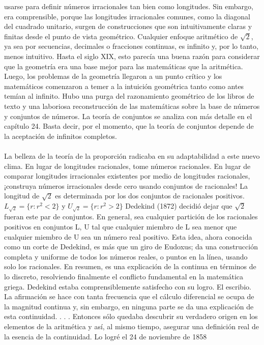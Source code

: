 \documentclass{book}
\begin{document}
    usarse para definir números irracionales tan bien como longitudes. Sin embargo, era comprensible, 
    porque las longitudes irracionales comunes, como la diagonal del cuadrado unitario, surgen de 
    construcciones que son intuitivamente claras y finitas desde el punto de vista geométrico. 
    Cualquier enfoque aritmético de $\sqrt{2}$, ya sea por secuencias, decimales o fracciones continuas, 
    es infinito y, por lo tanto, menos intuitivo. Hasta el siglo XIX, esto parecía una buena razón 
    para considerar que la geometría era una base mejor para las matemáticas que la aritmética.
    Luego, los problemas de la geometría llegaron a un punto crítico y
    los matemáticos comenzaron a temer a la intuición geométrica tanto como antes temían al infinito.
    Hubo una purga del razonamiento geométrico de los libros de texto y una laboriosa reconstrucción 
    de las matemáticas sobre la base de números y conjuntos de números. La teoría de conjuntos 
    se analiza con más detalle en el capítulo 24. Basta decir, por el momento, que la teoría de 
    conjuntos depende de la aceptación de infinitos completos.
    \\ \\ 
    La belleza de la teoría de la proporción radicaba en su adaptabilidad a este nuevo clima. 
    En lugar de longitudes racionales, tome números racionales. En lugar de comparar longitudes 
    irracionales existentes por medio de longitudes racionales,
    ¡construya números irracionales desde cero usando conjuntos de racionales!
    La longitud de $\sqrt{2}$ es determinada por los dos conjuntos de racionales positivos. 
    $L_{\sqrt{2}} = \{r: r^{2} < 2\}$ y $U_{\sqrt{2}} = \{r: r^{2} > 2\}$
    Dedekind (1872) decidió dejar que $\sqrt{2}$ fueran este par de conjuntos. En general, 
    sea cualquier partición 
    de los racionales positivos en conjuntos L, U tal que cualquier miembro de L sea menor que 
    cualquier miembro de U sea un número real positivo. Esta idea, ahora conocida como un corte de 
    Dedekind, es más que un giro de Eudoxus; da una construcción completa y uniforme de todos los 
    números reales, o puntos en la línea, usando solo los racionales. En resumen, es una explicación 
    de la continua
    en términos de lo discreto, resolviendo finalmente el conflicto fundamental en la matemática 
    griega. Dedekind estaba comprensiblemente satisfecho con su logro.
    El escribio.
    La afirmación se hace con tanta frecuencia que el cálculo diferencial se ocupa de la magnitud 
    continua y, sin embargo, en ninguna parte se da una explicación de esta continuidad. . . . 
    Entonces sólo quedaba descubrir su verdadero origen en los elementos de la aritmética y así, al
    mismo tiempo, asegurar una definición real de la esencia de la continuidad. 
    Lo logré el 24 de noviembre de 1858
\end{document}
